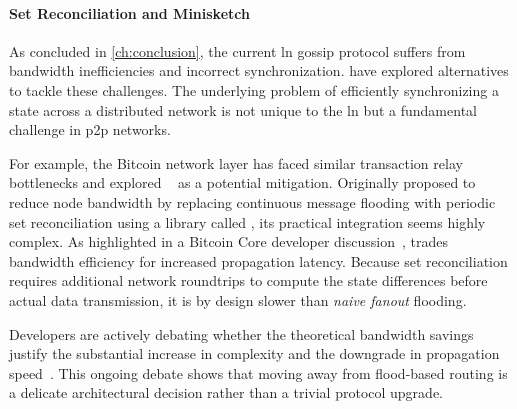 \paragraph{Set Reconciliation and Minisketch}

As concluded in \autoref{ch:conclusion}, the current \gls{ln} gossip protocol suffers 
from bandwidth inefficiencies and incorrect synchronization. 
\citeauthor{lightningdevelopers_bolts_2018} have explored alternatives to tackle these challenges. 
The underlying problem of efficiently synchronizing a state across a distributed network 
is not unique to the \gls{ln} but a fundamental challenge in \gls{p2p} networks.

For example, the Bitcoin network layer has faced similar transaction relay bottlenecks and 
explored ~\cite{naumenko_erlay_2019} as a potential mitigation. 
Originally proposed to reduce node bandwidth by replacing continuous message flooding
with periodic set reconciliation using a library called , 
its practical integration seems highly complex. 
As highlighted in a Bitcoin Core developer discussion~\cite{fleon_erlay_2026}, 
 trades bandwidth efficiency for increased propagation latency. 
Because set reconciliation requires additional network roundtrips to compute the state differences 
before actual data transmission, it is by design slower than \textit{naive fanout} flooding. 

Developers are actively debating whether the theoretical bandwidth savings justify 
the substantial increase in complexity and the downgrade in propagation speed~\cite{fleon_erlay_2026}. 
This ongoing debate shows that moving away from flood-based routing is a delicate 
architectural decision rather than a trivial protocol upgrade.

